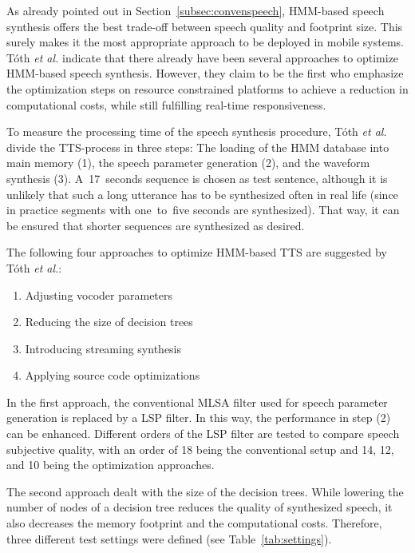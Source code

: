 As already pointed out in Section~\ref{subsec:convenspeech}, \ac{HMM}-based speech synthesis offers the best trade-off between speech quality and footprint size. This surely makes it the most appropriate approach to be deployed in mobile systems. T\'oth \textit{et al.} indicate that there already have been several approaches to optimize \ac{HMM}-based speech synthesis. However, they claim to be the first who emphasize the optimization steps on resource constrained platforms to achieve a reduction in computational costs, while still fulfilling real-time responsiveness.

To measure the processing time of the speech synthesis procedure, T\'oth \textit{et al.} divide the \ac{TTS}-process in three steps: The loading of the \ac{HMM} database
into main memory (1), the speech parameter generation (2), and the waveform synthesis (3). A~17~seconds sequence is chosen as test sentence, although it is unlikely that such a long utterance has to be synthesized often in real life (since in practice segments with one~to~five seconds are synthesized). That way, it can be ensured that shorter sequences are synthesized as desired.

The following four approaches to optimize \ac{HMM}-based \ac{TTS} are suggested by T\'oth \textit{et al.}:

\begin{enumerate}[label=\Alph*)]		%
	\parskip0.25em
	\bfseries
	\item Adjusting vocoder parameters
	\item Reducing the size of decision trees
	\item Introducing streaming synthesis
	\item Applying source code optimizations
\end{enumerate}

In the first approach, the conventional \ac{MLSA} filter used for speech parameter generation is replaced by a \ac{LSP} filter. In this way, the performance in step (2) can be enhanced. Different orders of the \ac{LSP} filter are tested to compare speech subjective quality, with an order of 18 being the conventional setup and 14, 12, and 10 being the optimization approaches.

The second approach dealt with the size of the decision trees. While lowering the number of nodes of a decision tree reduces the quality of synthesized speech, it also decreases the memory footprint and the computational costs. Therefore, three different test settings were defined (see Table~\ref{tab:settings}).

